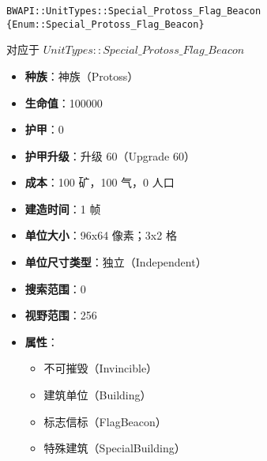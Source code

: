 \begin{tcolorbox}[colback=white, colframe=black!60!white, title=Special\_Protoss\_Flag\_Beacon(), arc=0mm]
    \begin{verbatim}
BWAPI::UnitTypes::Special_Protoss_Flag_Beacon {Enum::Special_Protoss_Flag_Beacon}
    \end{verbatim}
    对应于  $UnitTypes::Special\_Protoss\_Flag\_Beacon$ 
    \begin{itemize}
        \item \textbf{种族}：神族（Protoss）
        \item \textbf{生命值}：100000
        \item \textbf{护甲}：0
        \item \textbf{护甲升级}：升级 60（Upgrade 60）
        \item \textbf{成本}：100 矿，100 气，0 人口
        \item \textbf{建造时间}：1 帧
        \item \textbf{单位大小}：96x64 像素；3x2 格
        \item \textbf{单位尺寸类型}：独立（Independent）
        \item \textbf{搜索范围}：0
        \item \textbf{视野范围}：256
        \item \textbf{属性}：
            \begin{itemize}
                \item 不可摧毁（Invincible）
                \item 建筑单位（Building）
                \item 标志信标（FlagBeacon）
                \item 特殊建筑（SpecialBuilding）
            \end{itemize}
    \end{itemize}
\end{tcolorbox}

